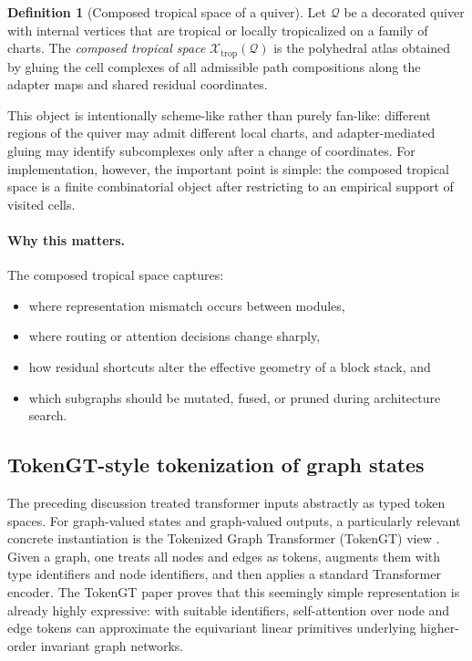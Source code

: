 \documentclass[11pt]{article}
\theoremstyle{definition}
\newtheorem{definition}{Definition}[section]
\theoremstyle{plain}
\theoremstyle{remark}
\newcommand{\mc}[1]{\mathcal{#1}}
\begin{document}
\begin{definition}[Composed tropical space of a quiver]
Let $\mc{Q}$ be a decorated quiver with internal vertices that are tropical or locally tropicalized on a family of charts.
The \emph{composed tropical space} $\mc{X}_{\mathrm{trop}}(\mc{Q})$ is the polyhedral atlas obtained by gluing the cell complexes of all admissible path compositions along the adapter maps and shared residual coordinates.
\end{definition}

This object is intentionally scheme-like rather than purely fan-like:
different regions of the quiver may admit different local charts, and adapter-mediated gluing may identify subcomplexes only after a change of coordinates.
For implementation, however, the important point is simple:
the composed tropical space is a finite combinatorial object after restricting to an empirical support of visited cells.

\paragraph{Why this matters.}
The composed tropical space captures:
\begin{itemize}[leftmargin=2em]
\item where representation mismatch occurs between modules,
\item where routing or attention decisions change sharply,
\item how residual shortcuts alter the effective geometry of a block stack, and
\item which subgraphs should be mutated, fused, or pruned during architecture search.
\end{itemize}

\subsection{TokenGT-style tokenization of graph states}
\label{sec:tokengt-setup}

The preceding discussion treated transformer inputs abstractly as typed token spaces.
For graph-valued states and graph-valued outputs, a particularly relevant concrete instantiation is the Tokenized Graph Transformer (TokenGT) view \cite{KimNguyenMinChoLeeLeeHong2022}.
Given a graph, one treats all nodes and edges as tokens, augments them with type identifiers and node identifiers, and then applies a standard Transformer encoder.
The TokenGT paper proves that this seemingly simple representation is already highly expressive:
with suitable identifiers, self-attention over node and edge tokens can approximate the equivariant linear primitives underlying higher-order invariant graph networks.
\end{document}
